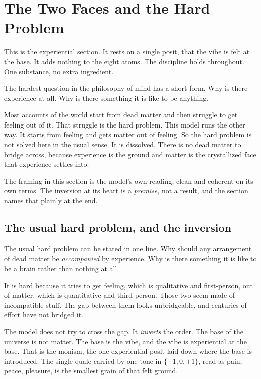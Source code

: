 \section{The Two Faces and the Hard Problem}

This is the experiential section. It rests on a single posit, that the vibe is felt at the base. It adds nothing to the eight atoms. The discipline holds throughout. One substance, no extra ingredient.

The hardest question in the philosophy of mind has a short form. Why is there experience at all. Why is there something it is like to be anything.

Most accounts of the world start from dead matter and then struggle to get feeling out of it. That struggle is the hard problem. This model runs the other way. It starts from feeling and gets matter out of feeling. So the hard problem is not solved here in the usual sense. It is dissolved. There is no dead matter to bridge across, because experience is the ground and matter is the crystallized face that experience settles into.

The framing in this section is the model's own reading, clean and coherent on its own terms. The inversion at its heart is a \emph{premise}, not a result, and the section names that plainly at the end.

\subsection{The usual hard problem, and the inversion}

The usual hard problem can be stated in one line. Why should any arrangement of dead matter be \emph{accompanied} by experience. Why is there something it is like to be a brain rather than nothing at all.

It is hard because it tries to get feeling, which is qualitative and first-person, out of matter, which is quantitative and third-person. Those two seem made of incompatible stuff. The gap between them looks unbridgeable, and centuries of effort have not bridged it.

The model does not try to cross the gap. It \emph{inverts} the order. The base of the universe is not matter. The base is the vibe, and the vibe is experiential at the base. That is the monism, the one experiential posit laid down where the base is introduced. The single quale carried by one tone in $\{-1, 0, +1\}$, read as pain, peace, pleasure, is the smallest grain of that felt ground.

